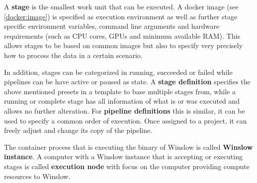 A \textbf{stage} is the smallest work unit that can be executed.
A docker image (see \autoref{docker:image}) is specified as execution environment as well as further stage specific environment variables, command line arguments and hardware requirements (such as CPU cores, GPUs and minimum available RAM).
This allows stages to be based on common images but also to specify very precisely how to process the data in a certain scenario.

In addition, stages can be categorized in running, succeeded or failed while pipelines can be have active or paused as state.
A \textbf{stage definition} specifies the above mentioned presets in a template to base multiple stages from, while a running or complete stage has all information of what is or was executed and allows no further alteration.
For \textbf{pipeline definitions} this is similar, it can be used to specify a common order of execution.
Once assigned to a project, it can freely adjust and change its copy of the pipeline.

The container process that is executing the binary of Winslow is called \textbf{Winslow instance}.
A computer with a Winslow instance that is accepting or executing stages is called \textbf{execution node} with focus on the computer providing compute resources to Winslow.


